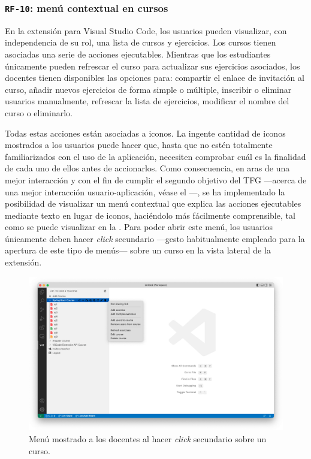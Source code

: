 \subsubsection{\texttt{RF-10}: menú contextual en cursos}
\label{subsec:rf10}

En la extensión para Visual Studio Code, los usuarios pueden visualizar, con independencia de su rol, una lista de cursos y ejercicios. Los cursos tienen asociadas una serie de acciones ejecutables. Mientras que los estudiantes únicamente pueden refrescar el curso para actualizar sus ejercicios asociados, los docentes tienen disponibles las opciones para: compartir el enlace de invitación al curso, añadir nuevos ejercicios de forma simple o múltiple, inscribir o eliminar usuarios manualmente, refrescar la lista de ejercicios, modificar el nombre del curso o eliminarlo.

Todas estas acciones están asociadas a iconos. La ingente cantidad de iconos mostrados a los usuarios puede hacer que, hasta que no estén totalmente familiarizados con el uso de la aplicación, necesiten comprobar cuál es la finalidad de cada uno de ellos antes de accionarlos. Como consecuencia, en aras de una mejor interacción y con el fin de cumplir el segundo objetivo del TFG ---acerca de una mejor interacción usuario-aplicación, véase el ---, se ha implementado la posibilidad de visualizar un menú contextual que explica las acciones ejecutables mediante texto en lugar de iconos, haciéndolo más fácilmente comprensible, tal como se puede visualizar en la . Para poder abrir este menú, los usuarios únicamente deben hacer \textit{click} secundario ---gesto habitualmente empleado para la apertura de este tipo de menús--- sobre un curso en la vista lateral de la extensión.

\begin{figure}[ht]
    \centering
    \includegraphics[width=\textwidth]{imagenes/utilizadas/4-3-implementacion/rf10-1.png}
    \caption{Menú mostrado a los docentes al hacer \textit{click} secundario sobre un curso.}
    \label{fig:reqf10-1}
\end{figure}
